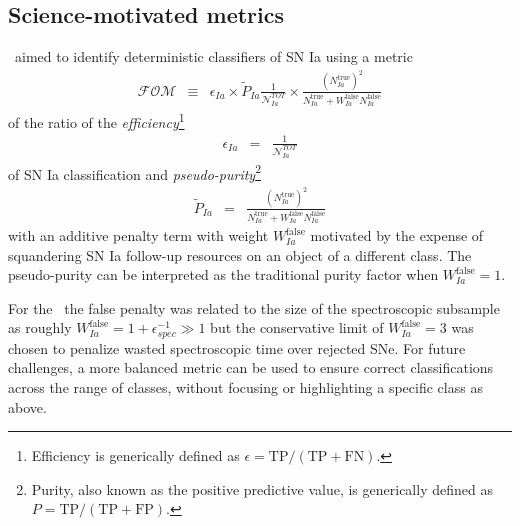 \subsection{Science-motivated metrics}
\label{sec:science}


\snphotcc\ aimed to identify deterministic classifiers of SN Ia using a metric
\begin{eqnarray}
  \label{eq:snphotccfom}
  \mathcal{FOM} &\equiv& \epsilon_{Ia} \times \tilde{P}_{Ia}
  \frac{1}{\mathcal{N}_{Ia}^{TOT}}\times \frac{(N_{Ia}^{\mathrm{true}})^2}{N_{Ia}^\mathrm{true}+W_{Ia}^\mathrm{false}N_{Ia}^\mathrm{false}}
\end{eqnarray}
of the ratio of the \textit{efficiency}\footnote{Efficiency is generically defined as $\epsilon = \mathrm{TP} / (\mathrm{TP} + \mathrm{FN})$.}
\begin{eqnarray}
  \label{eq:efficiency}
  \epsilon_{Ia} &=& \frac{1}{\mathcal{N}_{Ia}^{TOT}}
\end{eqnarray}
of SN Ia classification and \textit{pseudo-purity}\footnote{Purity, also known as the positive predictive value, is generically defined as $P = \mathrm{TP} / (\mathrm{TP} + \mathrm{FP})$.}
\begin{eqnarray}
  \label{eq:pseudopurity}
  \tilde{P}_{Ia} &=& \frac{(N_{Ia}^{\mathrm{true}})^2} {N_{Ia}^\mathrm{true} + W_{Ia}^\mathrm{false}N_{Ia}^\mathrm{false}}
\end{eqnarray}
with an additive penalty term with weight $W_{Ia}^\mathrm{false}$ motivated by the expense of squandering SN Ia follow-up resources on an object of a different class.
The pseudo-purity can be interpreted as the traditional purity factor when $W_{Ia}^\mathrm{false} = 1$.

For the \snphotcc\ the false penalty was related to the size of the spectroscopic subsample as roughly $W_{Ia}^\mathrm{false} = 1 + \epsilon_{spec}^{-1} \gg 1$ but the conservative limit of $W_{Ia}^\mathrm{false} = 3$ was chosen to penalize wasted spectroscopic time over rejected SNe.
For future challenges, a more balanced metric can be used to ensure correct classifications across the range of classes, without focusing or highlighting a specific class as above.


